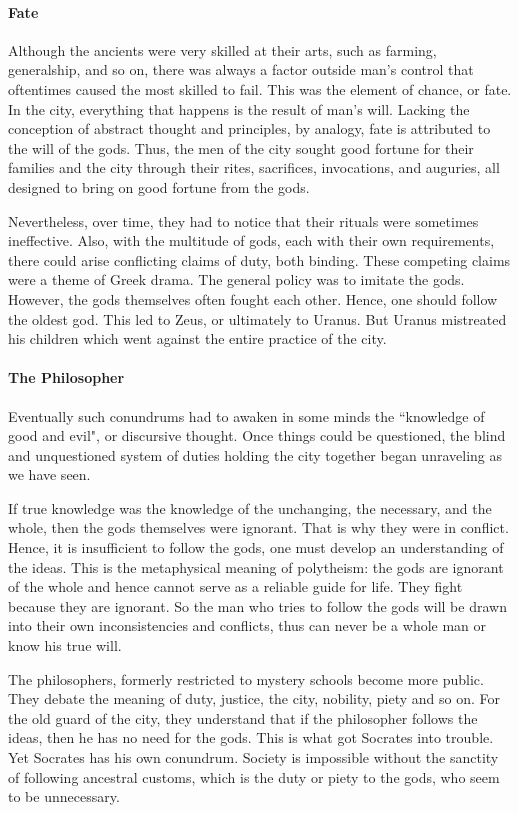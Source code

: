 \paragraph{Fate}
Although the ancients were very skilled at their arts, such as farming, generalship, and so on, there was always a factor outside man's control that oftentimes caused the most skilled to fail. This was the element of chance, or fate. In the city, everything that happens is the result of man's will. Lacking the conception of abstract thought and principles, by analogy, fate is attributed to the will of the gods. Thus, the men of the city sought good fortune for their families and the city through their rites, sacrifices, invocations, and auguries, all designed to bring on good fortune from the gods.

Nevertheless, over time, they had to notice that their rituals were sometimes ineffective. Also, with the multitude of gods, each with their own requirements, there could arise conflicting claims of duty, both binding. These competing claims were a theme of Greek drama. The general policy was to imitate the gods. However, the gods themselves often fought each other. Hence, one should follow the oldest god. This led to Zeus, or ultimately to Uranus. But Uranus mistreated his children which went against the entire practice of the city.

\paragraph{The Philosopher}
Eventually such conundrums had to awaken in some minds the ``knowledge of good and evil", or discursive thought. Once things could be questioned, the blind and unquestioned system of duties holding the city together began unraveling as we have seen.

If true knowledge was the knowledge of the unchanging, the necessary, and the whole, then the gods themselves were ignorant. That is why they were in conflict. Hence, it is insufficient to follow the gods, one must develop an understanding of the ideas. This is the metaphysical meaning of polytheism: the gods are ignorant of the whole and hence cannot serve as a reliable guide for life. They fight because they are ignorant. So the man who tries to follow the gods will be drawn into their own inconsistencies and conflicts, thus can never be a whole man or know his true will.

The philosophers, formerly restricted to mystery schools become more public. They debate the meaning of duty, justice, the city, nobility, piety and so on. For the old guard of the city, they understand that if the philosopher follows the ideas, then he has no need for the gods. This is what got Socrates into trouble. Yet Socrates has his own conundrum. Society is impossible without the sanctity of following ancestral customs, which is the duty or piety to the gods, who seem to be unnecessary.

